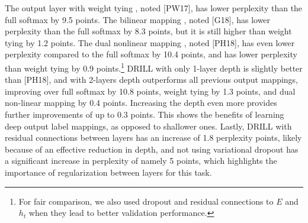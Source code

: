 \documentclass{article}
\begin{document}
The output layer with weight tying \cite{press17}, noted [PW17], has lower perplexity than the full softmax by 9.5 points. The bilinear mapping \cite{gulordava18}, noted [G18], has lower perplexity than the full softmax by 8.3 points, but it is still higher than weight tying by 1.2 points.  The dual nonlinear mapping \cite{pappas18}, noted [PH18], has even lower perplexity compared to the full softmax by 10.4 points, and has lower perplexity than weight tying by 0.9 points.\footnote{For fair comparison, we also used dropout and residual connections to $E$ and $h_t$ when they lead to better validation performance.} 
DRILL with only 1-layer depth is slightly better than [PH18], and with 2-layers depth outperforms all previous output mappings, improving over full softmax by 10.8 points, weight tying by 1.3 points, and dual non-linear mapping by 0.4 points. Increasing the depth even more provides further improvements of up to 0.3 points. This shows the benefits of learning deep output label mappings, as opposed to shallower ones. Lastly, DRILL with residual connections between layers  has an increase of 1.8 perplexity points, likely because of an effective reduction in depth, and not using variational dropout has a significant increase in perplexity of namely 5 points, which highlights the importance of regularization between layers for this task. 

 
\end{document}
